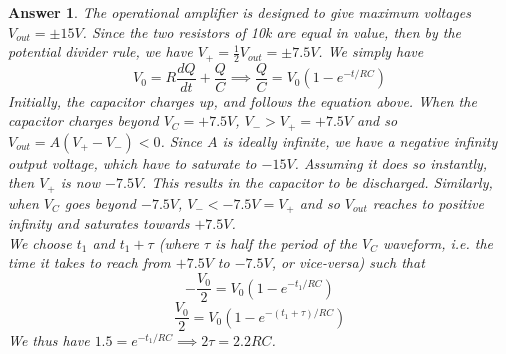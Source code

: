 \documentclass[a4paper]{article}
\newtheorem{ans}{Answer}[section]
\theoremstyle{new}
\begin{document}
\begin{ans}
The operational amplifier is designed to give maximum voltages $V_{out}=\pm15V$. Since the two resistors of 10k are equal in value, then by the potential divider rule, we have $V_+=\frac{1}{2}V_{out}=\pm7.5V$. We simply have
$$V_0=R\frac{dQ}{dt}+\frac{Q}{C}\implies\frac{Q}{C}=V_0(1-e^{-t/RC})$$
Initially, the capacitor charges up, and follows the equation above. When the capacitor charges beyond $V_C=+7.5V$, $V_->V_+=+7.5V$ and so $V_{out}=A(V_+-V_-)<0$. Since $A$ is ideally infinite, we have a negative infinity output voltage, which have to saturate to $-15V$. Assuming it does so instantly, then $V_+$ is now $-7.5V$. This results in the capacitor to be discharged. Similarly, when $V_C$ goes beyond $-7.5V$, $V_-<-7.5V=V_+$ and so $V_{out}$ reaches to positive infinity and saturates towards $+7.5V$.\\[5pt]
We choose $t_1$ and $t_1+\tau$ (where $\tau$ is half the period of the $V_C$ waveform, i.e. the time it takes to reach from $+7.5V$ to $-7.5V$, or vice-versa) such that
$$-\frac{V_0}{2}=V_0(1-e^{-t_1/RC})$$
$$\frac{V_0}{2}=V_0(1-e^{-(t_1+\tau)/RC})$$
We thus have $1.5=e^{-t_1/RC}\implies 2\tau=2.2RC$.
\end{ans}
\end{document}

